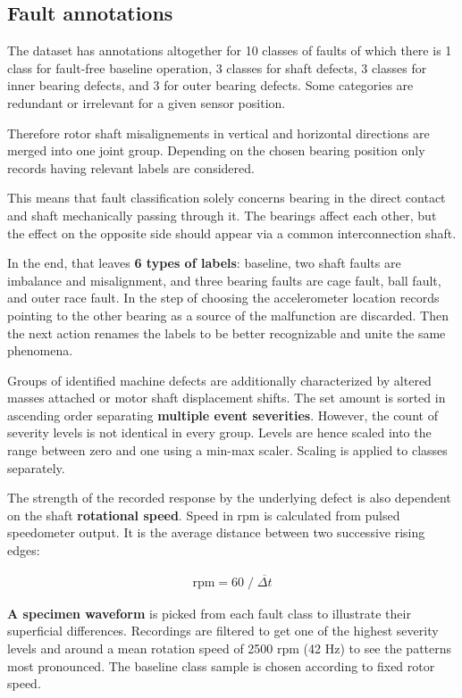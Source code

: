 \subsection{Fault annotations}
The dataset has annotations altogether for 10 classes of faults of which there is 1 class for fault-free baseline operation, 3 classes for shaft defects, 3 classes for inner bearing defects, and 3 for outer bearing defects. Some categories are redundant or irrelevant for a given sensor position. 

Therefore rotor shaft misalignements in vertical and horizontal directions are merged into one joint group. Depending on the chosen bearing position only records having relevant labels are considered. 

This means that fault classification solely concerns bearing in the direct contact and shaft mechanically passing through it. The bearings affect each other, but the effect on the opposite side should appear via a common interconnection shaft. 

In the end, that leaves \textbf{6 types of labels}: baseline, two shaft faults are imbalance and misalignment, and three bearing faults are cage fault, ball fault, and outer race fault. In the step of choosing the accelerometer location records pointing to the other bearing as a source of the malfunction are discarded. Then the next action renames the labels to be better recognizable and unite the same phenomena.

Groups of identified machine defects are additionally characterized by altered masses attached or motor shaft displacement shifts. The set amount is sorted in ascending order separating \textbf{multiple event severities}. However, the count of severity levels is not identical in every group. Levels are hence scaled into the range between zero and one using a min-max scaler. Scaling is applied to classes separately.

The strength of the recorded response by the underlying defect is also dependent on the shaft \textbf{rotational speed}. Speed in rpm is calculated from pulsed speedometer output. It is the average distance between two successive rising edges: 
\begin{ceqn}\begin{align}
\mathrm{rpm} = 60 \;/\; \overline{\Delta t}
\end{align}\end{ceqn}

\textbf{A specimen waveform} is picked from each fault class to illustrate their superficial differences. Recordings are filtered to get one of the highest severity levels and around a mean rotation speed of 2500 rpm (42 Hz)  to see the patterns most pronounced. The baseline class sample is chosen according to fixed rotor speed.


